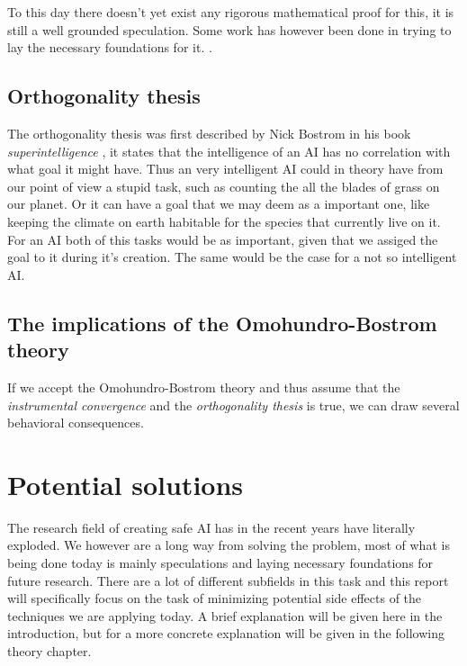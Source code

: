\documentclass{report}
\theoremstyle{definition}
\begin{document}
To this day there doesn't yet exist any rigorous mathematical proof for this, it is still a well grounded speculation. Some work has however been done in trying to lay the necessary foundations for it. \autocite{TURNER et al}.  

\subsection{Orthogonality thesis}
The orthogonality thesis was first described by Nick Bostrom in his book \textit{superintelligence} \cite{Bostrom}, it states that the intelligence of an AI has no correlation with what goal it might have. Thus an very intelligent AI could in theory have from our point of view a stupid task, such as counting the all the blades of grass on our planet. Or it can have a goal that we may deem as a important one, like keeping the climate on earth habitable for the species that currently live on it. For an AI both of this tasks would be as important, given that we assiged the goal to it during it's creation. The same would be the case for a not so intelligent AI.


\subsection{The implications of the Omohundro-Bostrom theory}
If we accept the Omohundro-Bostrom theory and thus assume that the \textit{instrumental convergence} and the \textit{orthogonality thesis} is true, we can draw several behavioral consequences.

\section{Potential solutions}
The research field of creating safe AI has in the recent years have literally exploded. We however are a long way from solving the problem, most of what is being done today is mainly speculations and laying necessary foundations for future research. There are a lot of different subfields in this task and this report will specifically focus on the task of minimizing potential side effects of the techniques we are applying today. A brief explanation will be given here in the introduction, but for a more concrete explanation will be given in the following theory chapter.  
\end{document}
